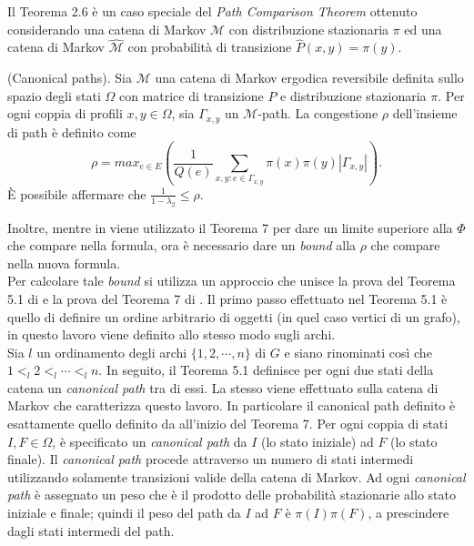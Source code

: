 Il Teorema 2.6 è un caso speciale del \textit{Path Comparison Theorem} ottenuto considerando una catena di Markov $\mathcal{M}$ con distribuzione stazionaria $\pi$ ed una catena di Markov $\hat{\mathcal{M}}$ con probabilità di transizione $\hat{P}(x,y) = \pi(y)$.
\begin{thm}
	[2.6](Canonical paths). Sia $\mathcal{M}$ una catena di Markov ergodica reversibile definita sullo spazio degli stati $\Omega$ con matrice di transizione $P$ e distribuzione stazionaria $\pi$. Per ogni coppia di profili $x, y \in \Omega$, sia $\Gamma_{x,y}$ un $\mathcal{M}$-path. La congestione $\rho$ dell'insieme di path è definito come
	\begin{equation}
		\rho = max_{e\in E}\left(\frac{1}{Q(e)}\sum_{x,y: e\in\Gamma_{x,y}}\pi(x)\pi(y)|\Gamma_{x,y}|\right).
	\end{equation}
	È possibile affermare che $\frac{1}{1 - \lambda_2} \leq \rho$.
\end{thm}
Inoltre, mentre in \cite{jerrum1993polynomial} viene utilizzato il Teorema 7 per dare un limite superiore alla $\Phi$ che compare nella formula, ora è necessario dare un \textit{bound} alla $\rho$ che compare nella nuova formula.\\
Per calcolare tale \textit{bound} si utilizza un approccio che unisce la prova del Teorema 5.1 di \cite{auletta2011convergence} e la prova del Teorema 7 di \cite{jerrum1993polynomial}. Il primo passo effettuato nel Teorema 5.1 è quello di definire un ordine arbitrario di oggetti (in quel caso vertici di un grafo), in questo lavoro viene definito allo stesso modo sugli archi.\\
Sia $l$ un ordinamento degli archi $\{1, 2, \cdots, n\}$ di $G$ e siano rinominati così che $1 <_l 2 <_l \cdots <_l n$.
In seguito, il Teorema 5.1 definisce per ogni due stati della catena un \textit{canonical path} tra di essi. La stesso viene effettuato sulla catena di Markov che caratterizza questo lavoro. In particolare il canonical path definito è esattamente quello definito da \cite{jerrum1993polynomial} all'inizio del Teorema 7.
Per ogni coppia di stati $I, F \in \Omega$, è specificato un \textit{canonical path} da $I$ (lo stato iniziale) ad $F$ (lo stato finale). Il \textit{canonical path} procede attraverso un numero di stati intermedi utilizzando solamente transizioni valide della catena di Markov. Ad ogni \textit{canonical path} è assegnato un peso che è il prodotto delle probabilità stazionarie allo stato iniziale e finale; quindi il peso del path da $I$ ad $F$ è $\pi(I)\pi(F)$, a prescindere dagli stati intermedi del path.
